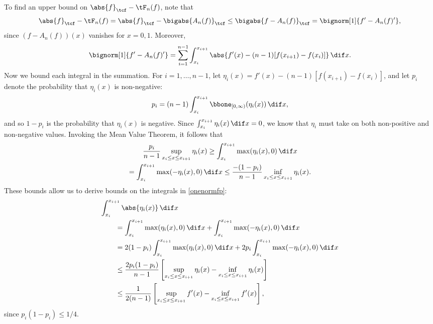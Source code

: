 \documentclass{iitthesis}
\theoremstyle{definition}
\theoremstyle{remark}
\newcommand{\Ftnorm}[1]{\abs{#1}_{\tcf}}
\begin{document}
To find an upper bound on $\Ftnorm{f}-\tF_{n}(f)$, note that
\begin{equation*}
\Ftnorm{f} - \tF_{n}(f) = \Ftnorm{f} - \bigabs{A_n(f)}_{\tcf} \le \bigabs{f-A_n(f)}_{\tcf} = \bignorm[1]{f' -A_n(f)'},
\end{equation*}
since $(f-A_n(f))(x)$ vanishes for $x=0,1$.  Moreover,
\begin{equation} \label{onenormfp}
\bignorm[1]{f' -A_n(f)'} = \sum_{i=1}^{n-1} \int_{x_i}^{x_{i+1}} \abs{f'(x) -(n-1)[f(x_{i+1})-f(x_i)]} \, \dif x.
\end{equation}
Now we bound each integral in the summation.  For $i=1, \ldots, n-1$, let $\eta_i(x) = f'(x) -(n-1)[f(x_{i+1})-f(x_i)]$, and let $p_i$ denote the probability that $\eta_i(x)$ is non-negative:
\[
p_i = (n-1)\int_{x_i}^{x_{i+1}} \bbone_{[0,\infty)} (\eta_i(x)) \, \dif x,
\]
and so $1-p_i$ is the probability that $\eta_i(x)$ is negative.  Since $\int_{x_i}^{x_{i+1}} \eta_i(x) \, \dif x =0$, we know that $\eta_i$ must take on both non-positive and non-negative values.  Invoking the Mean Value Theorem, it follows that
\begin{multline*}
\frac{p_i}{n-1} \sup_{x_i \le x \le x_{i+1}} \eta_i(x) \ge \int_{x_i}^{x_{i+1}} \max(\eta_i(x),0) \, \dif x \\
= \int_{x_i}^{x_{i+1}} \max(-\eta_i(x),0) \, \dif x \le \frac{-(1-p_i)}{n-1} \inf_{x_i \le x \le x_{i+1}} \eta_i(x) .
\end{multline*}
These bounds allow us to derive bounds on the integrals in \eqref{onenormfp}:
\begin{align*}
\MoveEqLeft{\int_{x_i}^{x_{i+1}} \abs{\eta_i(x)} \, \dif x} \\
 &= \int_{x_i}^{x_{i+1}} \max(\eta_i(x),0) \, \dif x + \int_{x_i}^{x_{i+1}} \max(-\eta_i(x),0) \, \dif x\\
&=2(1-p_i) \int_{x_i}^{x_{i+1}} \max(\eta_i(x),0) \, \dif x + 2p_i\int_{x_i}^{x_{i+1}} \max(-\eta_i(x),0) \, \dif x\\
&\le \frac{2p_i(1-p_i)}{n-1} \left[ \sup_{x_i \le x \le x_{i+1}} \eta_i(x) - \inf_{x_i \le x \le x_{i+1}} \eta_i(x) \right]\\
&\le\frac{1}{2(n-1)} \left[ \sup_{x_i \le x \le x_{i+1}} f'(x) - \inf_{x_i \le x \le x_{i+1}} f'(x) \right],
\end{align*}
since $p_i(1-p_i)\le 1/4$.
\end{document}
